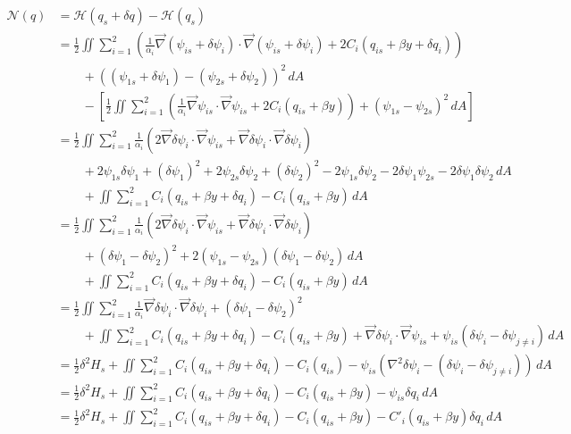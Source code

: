 \documentclass[12pt]{article}
\begin{document}
{{        \begin{align*}
            \mathcal{N}(q)
            & = \mathcal{H}(q_s + \delta q) - \mathcal{H}(q_s) \\
            &= \frac12 \iint \sum_{i=1}^2 \left( \frac{1}{\alpha_i}\vec\nabla (\psi_{is} + \delta\psi_i) \cdot \vec\nabla (\psi_{is} + \delta\psi_i) + 2C_i(q_{is} + \beta y + \delta q_i) \right) \\
            &\quad\quad + ((\psi_{1s} + \delta\psi_1) - (\psi_{2s} + \delta\psi_2))^2 \, dA \\
            &\quad\quad - \left[ \frac12 \iint \sum_{i=1}^2 \left( \frac{1}{\alpha_i}\vec\nabla \psi_{is} \cdot \vec\nabla \psi_{is} + 2C_i(q_{is} + \beta y) \right) + (\psi_{1s} - \psi_{2s})^2 \, dA \right] \\
            &= \frac12 \iint \sum_{i=1}^2 \frac{1}{\alpha_i} (2 \vec\nabla\delta\psi_i \cdot \vec\nabla\psi_{is} + \vec\nabla\delta\psi_i \cdot \vec\nabla\delta\psi_i) \\
            &\quad\quad + 2\psi_{1s}\delta\psi_1 + (\delta\psi_1)^2 + 2\psi_{2s}\delta\psi_2 + (\delta\psi_2)^2 - 2\psi_{1s}\delta\psi_2 - 2\delta\psi_1\psi_{2s} - 2\delta\psi_1\delta\psi_2 \, dA \\
            &\quad\quad + \iint \sum_{i=1}^2 C_i(q_{is} + \beta y + \delta q_i) - C_i(q_{is} + \beta y) \, dA \\
            &= \frac12 \iint \sum_{i=1}^2 \frac{1}{\alpha_i} (2 \vec\nabla\delta\psi_i \cdot \vec\nabla\psi_{is} + \vec\nabla\delta\psi_i \cdot \vec\nabla\delta\psi_i) \\
            &\quad\quad + (\delta\psi_1 - \delta\psi_2)^2 + 2(\psi_{1s} - \psi_{2s})(\delta\psi_1 - \delta\psi_2) \, dA \\
            &\quad\quad + \iint \sum_{i=1}^2 C_i(q_{is} + \beta y + \delta q_i) - C_i(q_{is} + \beta y) \, dA \\
            &= \frac12 \iint \sum_{i=1}^2 \frac{1}{\alpha_i} \vec\nabla\delta\psi_i \cdot \vec\nabla\delta\psi_i + (\delta\psi_1 - \delta\psi_2)^2 \\
            &\quad\quad + \iint \sum_{i=1}^2 C_i(q_{is} + \beta y + \delta q_i) - C_i(q_{is} + \beta y) + \vec\nabla\delta\psi_i \cdot \vec\nabla\psi_{is} + \psi_{is}(\delta\psi_i - \delta\psi_{j \ne i}) \, dA \\
            &= \frac12 \delta^2 H_s + \iint \sum_{i=1}^2 C_i(q_{is} + \beta y + \delta q_i) - C_i(q_{is}) - \psi_{is}(\nabla^2\delta\psi_i - (\delta\psi_i - \delta\psi_{j \ne i})) \, dA \\
            &= \frac12 \delta^2 H_s + \iint \sum_{i=1}^2 C_i(q_{is} + \beta y + \delta q_i) - C_i(q_{is} + \beta y) - \psi_{is}\delta q_i \, dA \\
            &= \frac12 \delta^2 H_s + \iint \sum_{i=1}^2 C_i(q_{is} + \beta y + \delta q_i) - C_i(q_{is} + \beta y) - C'_i(q_{is} + \beta y)\delta q_i \, dA \\
        \end{align*}
    }
}
\end{document}
